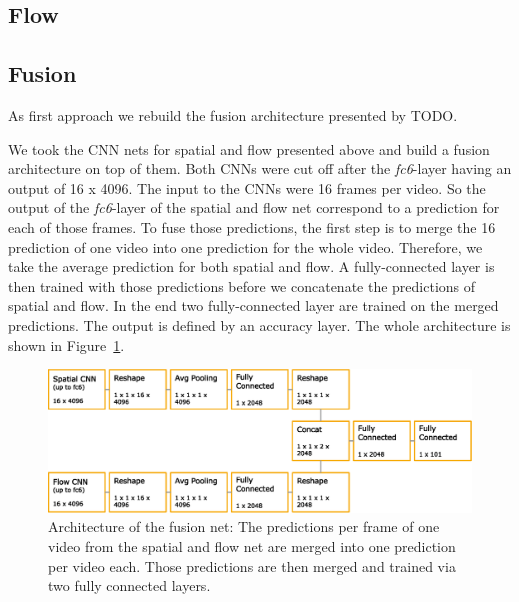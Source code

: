 \subsection{Flow}
\label{subsec:flow}


\subsection{Fusion}
\label{subsec:fusion}
As first approach we rebuild the fusion architecture presented by TODO.

We took the CNN nets for spatial and flow presented above and build a fusion architecture on top of them.
Both CNNs were cut off after the \textit{fc6}-layer having an output of 16 x 4096.
The input to the CNNs were 16 frames per video.
So the output of the \textit{fc6}-layer of the spatial and flow net correspond to a prediction for each of those frames.
To fuse those predictions, the first step is to merge the 16 prediction of one video into one prediction for the whole video.
Therefore, we take the average prediction for both spatial and flow.
A fully-connected layer is then trained with those predictions before we concatenate the predictions of spatial and flow.
In the end two fully-connected layer are trained on the merged predictions.
The output is defined by an accuracy layer.
The whole architecture is shown in Figure~\ref{fig:fusion_architecture}.
\begin{figure}[!htb]
	\centering
	\includegraphics[scale=.7]{images/fusion_architecture.eps}
	\caption{Architecture of the fusion net: The predictions per frame of one video from the spatial and flow net are merged into one prediction per video each. Those predictions are then merged and trained via two fully connected layers.}
	\label{fig:fusion_architecture}
\end{figure}






